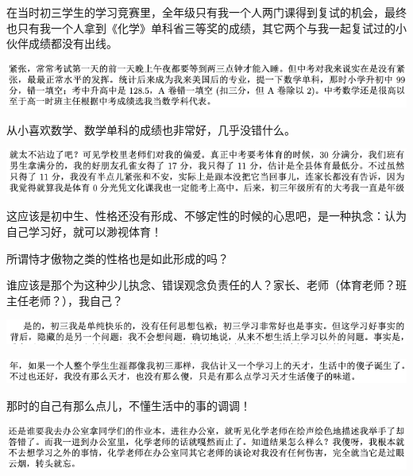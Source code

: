 \documentclass[9pt, b5paper]{article}
\begin{document}
在当时初三学生的学习竞赛里，全年级只有我一个人两门课得到复试的机会，最终也只有我一个人拿到《化学》单科省三等奖的成绩，其它两个与我一起复试过的小伙伴成绩都没有出线。 

\begin{center}
\includegraphics[width=.9\linewidth]{./pic/backups_plans_20210422_102326.png}
\end{center}

从小喜欢数学、数学单科的成绩也非常好，几乎没错什么。

\begin{center}
\includegraphics[width=.9\linewidth]{./pic/backups_plans_20210422_101951.png}
\end{center}

这应该是初中生、性格还没有形成、不够定性的时候的心思吧，是一种执念：认为自己学习好，就可以渺视体育！

所谓恃才傲物之类的性格也是如此形成的吗？

谁应该是那个为这种少儿执念、错误观念负责任的人？家长、老师（体育老师？班主任老师？），我自己？

\begin{center}
\includegraphics[width=.9\linewidth]{./pic/backups_plans_20210422_102437.png}
\end{center}

\begin{center}
\includegraphics[width=.9\linewidth]{./pic/backups_plans_20210422_102457.png}
\end{center}

那时的自己有那么点儿，不懂生活中的事的调调！

\begin{center}
\includegraphics[width=.9\linewidth]{./pic/backups_plans_20210422_102534.png}
\end{center}
\end{document}
